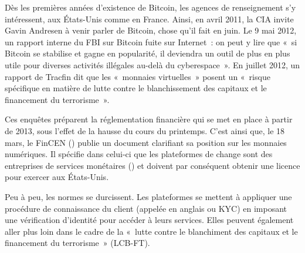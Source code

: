 
Dès les premières années d'existence de Bitcoin, les agences de renseignement s'y intéressent, aux États-Unis comme en France. Ainsi, en avril 2011, la CIA invite Gavin Andresen à venir parler de Bitcoin, chose qu'il fait en juin. Le 9 mai 2012, un rapport interne du FBI sur Bitcoin fuite sur Internet~: on peut y lire que «~si Bitcoin se stabilise et gagne en popularité, il deviendra un outil de plus en plus utile pour diverses activités illégales au-delà du cyberespace~». En juillet 2012, un rapport de Tracfin dit que les «~monnaies virtuelles~» posent un «~risque spécifique en matière de lutte contre le blanchissement des capitaux et le financement du terrorisme~».

Ces enquêtes préparent la réglementation financière qui se met en place à partir de 2013, sous l'effet de la hausse du cours du printemps. C'est ainsi que, le 18 mars, le FinCEN () publie un document clarifiant sa position sur les monnaies numériques. Il spécifie dans celui-ci que les plateformes de change sont des entreprises de services monétaires () et doivent par conséquent obtenir une licence pour exercer aux États-Unis.

Peu à peu, les normes se durcissent. Les plateformes se mettent à appliquer une procédure de connaissance du client (appelée en anglais  ou KYC) en imposant une vérification d'identité pour accéder à leurs services. Elles peuvent également aller plus loin dans le cadre de la «~lutte contre le blanchiment des capitaux et le financement du terrorisme~» (LCB-FT).

